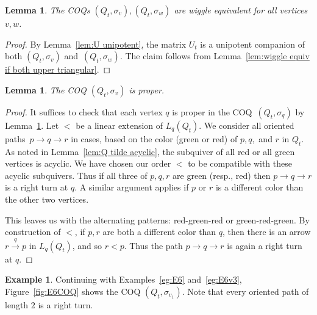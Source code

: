 \documentclass[11pt, letterpaper]{amsart}
\newtheorem{lemma}[theorem]{Lemma}
\theoremstyle{definition}
\newtheorem{example}[theorem]{Example}
\numberwithin{equation}{section}
\newcommand{\Qtmut}{Q_t}
\newcommand{\Lgraph}{L}
\begin{document}
\pagebreak[2]

\begin{lemma}
\label{lem: Q tilde wiggle}
The COQs $(\Qtmut, \sigma_v), (\Qtmut, \sigma_w)$ are wiggle equivalent for all vertices~$v,w$.
\end{lemma}
\begin{proof}
By Lemma~\ref{lem:U unipotent}, the matrix $U_t$ is a unipotent companion of both $(\Qtmut, \sigma_v)$ and~$(\Qtmut, \sigma_w)$. %
The claim follows from Lemma~\ref{lem:wiggle equiv if both upper triangular}.
\end{proof}



\begin{lemma}
\label{lem:U gives proper}
The COQ $(\Qtmut, \sigma_v)$ is proper.
\end{lemma}

\begin{proof}
It suffices to check that each vertex $q$ is proper in the COQ~$(\Qtmut, \sigma_q)$ by Lemma~\ref{lem: Q tilde wiggle}. 
Let $<$ be a linear extension of  $\Lgraph_{q}(\Qtmut)$.
We consider all oriented paths~${p \rightarrow q \rightarrow r}$ in cases, based on the color (green or red) of $p,q,$ and $r$ in $\Qtmut$.
As noted in Lemma~\ref{lem:Q tilde acyclic}, the subquiver of all red or all green vertices is acyclic.
We have chosen our order $<$ to be compatible with these acyclic subquivers.
Thus if all three of $p,q,r$ are green (resp., red) then $p \rightarrow q \rightarrow r$ is a right turn at $q$. %
A similar argument applies if $p$ or $r$ is a different color than the other two vertices.

This leaves us with the alternating patterns: red-green-red or green-red-green. 
By construction of $<$, if $p,r$ are both a different color than $q$, then there is an arrow $r \stackrel{q}{\rightarrow} p$ in  $\Lgraph_{q}(\Qtmut)$, and so $r<p$. %
Thus the path $p \rightarrow q \rightarrow r$ is again a right turn at $q$.
\end{proof}

\begin{example}
Continuing with Examples~\ref{eg:E6} and~\ref{eg:E6v3}, Figure~\ref{fig:E6COQ} shows the COQ $(\Qtmut, \sigma_{v_1})$. 
Note that every oriented path of length $2$ is a right turn.
\end{example}
\end{document}
